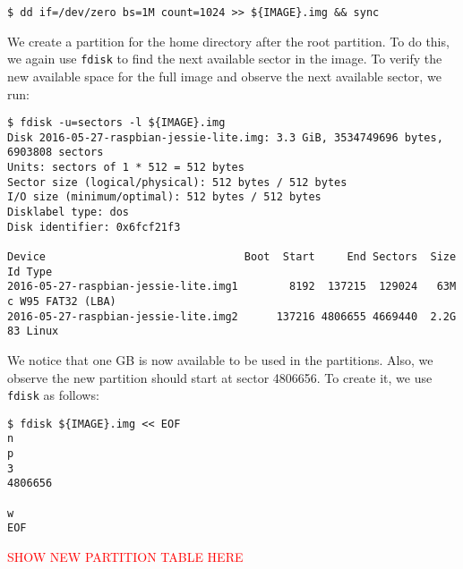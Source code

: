 \begin{lstlisting}[]
$ dd if=/dev/zero bs=1M count=1024 >> ${IMAGE}.img && sync
\end{lstlisting}
\FloatBarrier
\vspace{-5mm}

We create a partition for the home directory after the root partition.
To do this, we again use \texttt{fdisk} to find the next available sector
in the image. To verify the new available space for the full image and observe
the next available sector, we run:
\begin{lstlisting}[]
$ fdisk -u=sectors -l ${IMAGE}.img
Disk 2016-05-27-raspbian-jessie-lite.img: 3.3 GiB, 3534749696 bytes, 6903808 sectors
Units: sectors of 1 * 512 = 512 bytes
Sector size (logical/physical): 512 bytes / 512 bytes
I/O size (minimum/optimal): 512 bytes / 512 bytes
Disklabel type: dos
Disk identifier: 0x6fcf21f3

Device                               Boot  Start     End Sectors  Size Id Type
2016-05-27-raspbian-jessie-lite.img1        8192  137215  129024   63M  c W95 FAT32 (LBA)
2016-05-27-raspbian-jessie-lite.img2      137216 4806655 4669440  2.2G 83 Linux
\end{lstlisting}
\FloatBarrier
\vspace{-5mm}

We notice that one GB is now available to be used in the partitions. Also, we
observe the new partition should start at sector 4806656. To create it, we
use \texttt{fdisk} as follows:%

%
%
%
\begin{lstlisting}[]
$ fdisk ${IMAGE}.img << EOF
n
p
3
4806656

w
EOF
\end{lstlisting}
\FloatBarrier
\vspace{-5mm}

\textcolor{red}{SHOW NEW PARTITION TABLE HERE}

